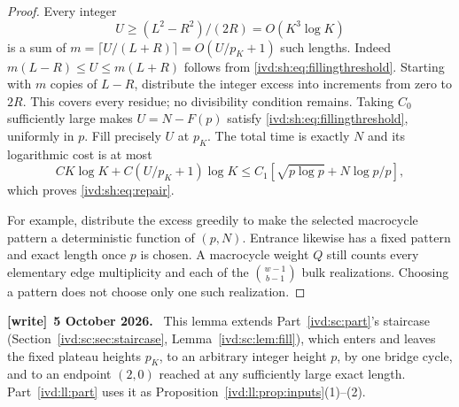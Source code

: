 \documentclass[11pt,letterpaper]{article}
\theoremstyle{remark}\newtheorem{remark}[theorem]{Remark}
\numberwithin{equation}{section}
\newenvironment{writenote}[1][]{\par\smallskip\begingroup\small
 \noindent\textbf{[write]}\if\relax\detokenize{#1}\relax\else~\textbf{#1.}\fi\ }%
 {\par\endgroup\smallskip}
\begin{document}
\begin{proof}
Every integer
\begin{equation}\label{ivd:sh:eq:fillingthreshold}
 U\ge (L^2-R^2)/(2R)=O(K^3\log K)
\end{equation}
is a sum of $m=\lceil U/(L+R)\rceil=O(U/p_K+1)$ such lengths.
Indeed $m(L-R)\le U\le m(L+R)$ follows from
\eqref{ivd:sh:eq:fillingthreshold}. Starting with $m$ copies of $L-R$,
distribute the integer excess into increments from zero to $2R$.
This covers every residue; no divisibility condition remains.
Taking $C_0$ sufficiently large makes $U=N-F(p)$ satisfy
\eqref{ivd:sh:eq:fillingthreshold}, uniformly in $p$. Fill precisely $U$
at $p_K$. The total time is exactly $N$ and its logarithmic cost
is at most
\[
 CK\log K+C(U/p_K+1)\log K
 \le C_1[\sqrt{p\log p}+N\log p/p],
\]
which proves \eqref{ivd:sh:eq:repair}.

For example, distribute the excess greedily to make the selected
macrocycle pattern a deterministic function of $(p,N)$.
Entrance likewise has a fixed pattern and exact length once $p$ is
chosen. A macrocycle weight $Q$ still counts every elementary edge
multiplicity and each of the $\binom{w-1}{b-1}$ bulk realizations.
Choosing a pattern does not choose only one such realization.
\end{proof}
\begin{writenote}[5 October 2026]
This lemma extends Part~\ref{ivd:sc:part}'s staircase (Section~\ref{ivd:sc:sec:staircase}, Lemma~\ref{ivd:sc:lem:fill}), which enters and leaves the fixed plateau heights $p_K$, to an arbitrary integer height $p$, by one bridge cycle, and to an endpoint $(2,0)$ reached at any sufficiently large exact length. Part~\ref{ivd:ll:part} uses it as Proposition~\ref{ivd:ll:prop:inputs}(1)--(2).
\end{writenote}
\end{document}
